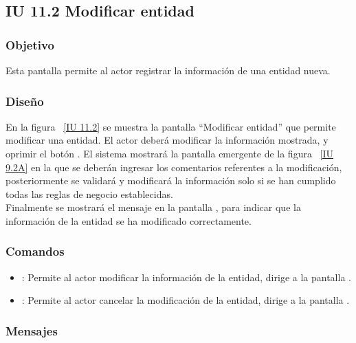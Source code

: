 \newpage 
\subsection{IU 11.2 Modificar entidad}

\subsubsection{Objetivo}
	
	Esta pantalla permite al actor registrar la información de una entidad nueva.

\subsubsection{Diseño}

    En la figura ~\ref{IU 11.2} se muestra la pantalla ``Modificar entidad'' que permite modificar una entidad. El actor deberá modificar la información mostrada,
    y oprimir el botón . El sistema mostrará la pantalla emergente de la figura ~\ref{IU 9.2A} en la que se deberán ingresar los comentarios referentes a la modificación, posteriormente se validará y modificará la información solo si se han cumplido todas las reglas de negocio establecidas. \\
    
    Finalmente se mostrará el mensaje  en la pantalla , para indicar que la información de la entidad se ha modificado correctamente.        

	

\subsubsection{Comandos}
\begin{itemize}
	\item {}: Permite al actor modificar la información de la entidad, dirige a la pantalla .
	\item {}: Permite al actor cancelar la modificación de la entidad, dirige a la pantalla .
\end{itemize}

\subsubsection{Mensajes}

